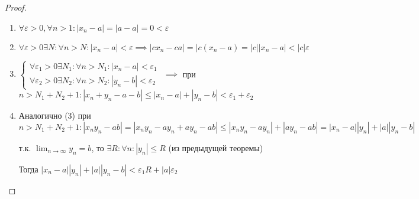 \begin{proof}
    \begin{enumerate}
        \item $\forall \varepsilon > 0, \forall n > 1: |x_n - a| = |a - a| = 0 < \varepsilon$
        \item $\forall \varepsilon > 0 \exists N: \forall n > N: |x_n - a| < \varepsilon \implies |cx_n - ca| = |c(x_n - a) = |c||x_n - a| < |c|\varepsilon$
        \item $\begin{cases}
            \forall \varepsilon_1 > 0 \exists N_1: \forall n > N_1: |x_n - a| < \varepsilon_1 \\
            \forall \varepsilon_2 > 0 \exists N_2: \forall n > N_2: |y_n - b| < \varepsilon_2
        \end{cases}$ $\implies$ при $n > N_1 + N_2 + 1: |x_n + y_n - a - b| \leq |x_n - a| + |y_n - b| < \varepsilon_1 + \varepsilon_2$
        \item Аналогично (3) при $n > N_1 + N_2 + 1: |x_ny_n - ab| = |x_ny_n - ay_n + ay_n - ab| \leq |x_ny_n - ay_n| + |ay_n - ab| = |x_n - a||y_n| + |a||y_n - b|$
        
        т.к. $\lim_{n \to \infty} y_n = b$, то $\exists R: \forall n: |y_n| \leq R$ (из предыдущей теоремы)

        Тогда $|x_n - a||y_n| + |a||y_n - b| < \varepsilon_1R + |a|\varepsilon_2$
    \end{enumerate}
\end{proof}

